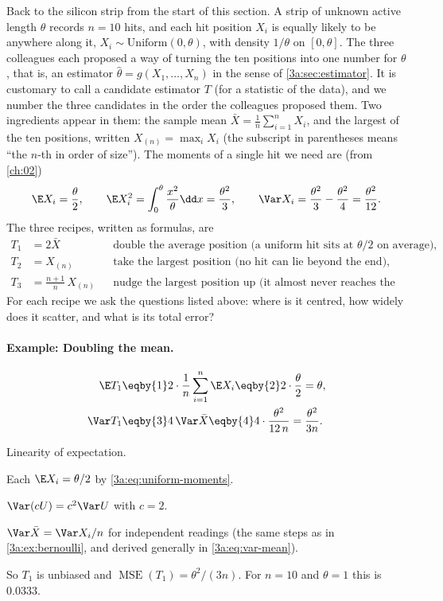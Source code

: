 Back to the silicon strip from the start of this section. A strip of unknown
active length $\theta$ records $n=10$ hits, and each hit position $X_i$ is
equally likely to be anywhere along it, $X_i\sim\mathrm{Uniform}(0,\theta)$,
with density $1/\theta$ on $[0,\theta]$. The three colleagues each proposed a
way of turning the ten positions into one number for $\theta$, that is, an
estimator $\hat\theta=g(X_1,\dots,X_n)$ in the sense of \cref{3a:sec:estimator}.
It is customary to call a candidate estimator $T$ (for a statistic of the data),
and we number the three candidates in the order the colleagues proposed them.
Two ingredients appear in them: the sample mean
$\bar X=\frac1n\sum_{i=1}^nX_i$, and the largest of the ten positions, written
$X_{(n)}=\max_iX_i$ (the subscript in parentheses means ``the $n$-th in order of
size''). The moments of a single hit we need are (from \cref{ch:02})
\begin{equation}
  \E X_i=\frac\theta2,\qquad \E X_i^2=\int_0^\theta\frac{x^2}{\theta}\dd x=\frac{\theta^2}{3},
  \qquad \Var X_i=\frac{\theta^2}{3}-\frac{\theta^2}{4}=\frac{\theta^2}{12}.
  \label{3a:eq:uniform-moments}
\end{equation}
The three recipes, written as formulas, are
\begin{align*}
  T_1&=2\bar X &&\text{double the average position (a uniform hit sits at $\theta/2$ on average),}\\
  T_2&=X_{(n)} &&\text{take the largest position (no hit can lie beyond the end),}\\
  T_3&=\tfrac{n+1}{n}\,X_{(n)} &&\text{nudge the largest position up (it almost never reaches the end).}
\end{align*}
For each recipe we ask the questions listed above: where is it centred, how
widely does it scatter, and what is its total error?

\paragraph{Example: Doubling the mean.}
\label{3a:ex:uniform-mean}
\begin{align*}
  \E T_1 &\eqby{1} 2\cdot\frac1n\sum_{i=1}^n\E X_i \eqby{2} 2\cdot\frac\theta2=\theta,\\
  \Var T_1 &\eqby{3} 4\,\Var\bar X \eqby{4} 4\cdot\frac{\theta^2}{12\,n}=\frac{\theta^2}{3n}.
\end{align*}
\begin{explain}
  \item Linearity of expectation.
  \item Each $\E X_i=\theta/2$ by \eqref{3a:eq:uniform-moments}.
  \item $\Var(cU)=c^2\Var U$ with $c=2$.
  \item $\Var\bar X=\Var X_i/n$ for independent readings (the same steps as in
        \cref{3a:ex:bernoulli}, and derived generally in \eqref{3a:eq:var-mean}).
\end{explain}
So $T_1$ is unbiased and $\operatorname{MSE}(T_1)=\theta^2/(3n)$. For $n=10$
and $\theta=1$ this is $0.0333$.

